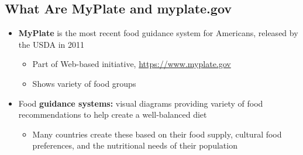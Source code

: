 \documentclass[12pt]{article}
\begin{document}
        \subsection{What Are MyPlate and myplate.gov}
            \begin{itemize}
                \item \textbf{MyPlate} is the most recent food guidance system for Americans, released by the USDA in 2011
                    \begin{itemize}
                        \item Part of Web-based initiative, \href{https://www.myplate.gov}{https://www.myplate.gov}
                        \item Shows variety of food groups
                    \end{itemize}
                \item Food \textbf{guidance systems:} visual diagrams providing variety of food recommendations to help create a well-balanced diet
                    \begin{itemize}
                        \item Many countries create these based on their food supply, cultural food preferences, and the nutritional needs of their population
                    \end{itemize}
            \end{itemize}
        
\end{document}
